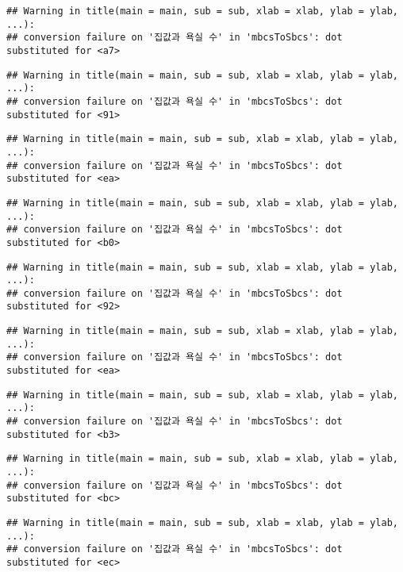 \documentclass[
]{article}
\begin{document}
\begin{verbatim}
## Warning in title(main = main, sub = sub, xlab = xlab, ylab = ylab, ...):
## conversion failure on '집값과 욕실 수' in 'mbcsToSbcs': dot substituted for <a7>
\end{verbatim}

\begin{verbatim}
## Warning in title(main = main, sub = sub, xlab = xlab, ylab = ylab, ...):
## conversion failure on '집값과 욕실 수' in 'mbcsToSbcs': dot substituted for <91>
\end{verbatim}

\begin{verbatim}
## Warning in title(main = main, sub = sub, xlab = xlab, ylab = ylab, ...):
## conversion failure on '집값과 욕실 수' in 'mbcsToSbcs': dot substituted for <ea>
\end{verbatim}

\begin{verbatim}
## Warning in title(main = main, sub = sub, xlab = xlab, ylab = ylab, ...):
## conversion failure on '집값과 욕실 수' in 'mbcsToSbcs': dot substituted for <b0>
\end{verbatim}

\begin{verbatim}
## Warning in title(main = main, sub = sub, xlab = xlab, ylab = ylab, ...):
## conversion failure on '집값과 욕실 수' in 'mbcsToSbcs': dot substituted for <92>
\end{verbatim}

\begin{verbatim}
## Warning in title(main = main, sub = sub, xlab = xlab, ylab = ylab, ...):
## conversion failure on '집값과 욕실 수' in 'mbcsToSbcs': dot substituted for <ea>
\end{verbatim}

\begin{verbatim}
## Warning in title(main = main, sub = sub, xlab = xlab, ylab = ylab, ...):
## conversion failure on '집값과 욕실 수' in 'mbcsToSbcs': dot substituted for <b3>
\end{verbatim}

\begin{verbatim}
## Warning in title(main = main, sub = sub, xlab = xlab, ylab = ylab, ...):
## conversion failure on '집값과 욕실 수' in 'mbcsToSbcs': dot substituted for <bc>
\end{verbatim}

\begin{verbatim}
## Warning in title(main = main, sub = sub, xlab = xlab, ylab = ylab, ...):
## conversion failure on '집값과 욕실 수' in 'mbcsToSbcs': dot substituted for <ec>
\end{verbatim}
\end{document}
